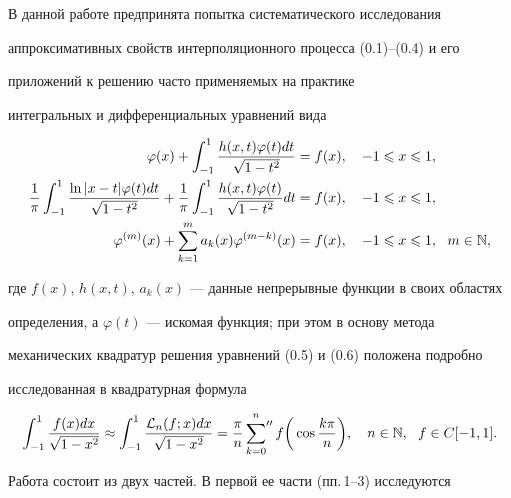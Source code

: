 В данной работе предпринята попытка систематического исследования 


аппроксимативных свойств интерполяционного процесса (0.1)--(0.4) и его 


приложений к решению часто применяемых на практике


интегральных и дифференциальных уравнений вида


\begin{align}


\varphi(x)+\int_{-1}^{1}\frac{h(x,t)\varphi(t)dt}{\sqrt{1-t^2}}&=f(x),


\quad -1 \lea x \lea 1, \\


%


\frac{1}{\pi}\int_{-1}^{1}\frac{\ln|x-t|\varphi(t)dt}{\sqrt{1-t^2}}+


\frac{1}{\pi}\int_{-1}^{1}\frac{h(x,t)\varphi(t)}{\sqrt{1-t^2}}dt&=f(x),


\quad -1 \lea x \lea 1, \\


%


\varphi^{(m)}(x)+\sum_{k=1}^{m}a_k(x)\varphi^{(m-k)}(x)&=f(x),


\quad -1 \lea x \lea 1,\ \ m\in \N,


\end{align}


где $f(x)$, $h(x,t)$, $a_k(x)$ --- данные непрерывные функции в своих областях 


определения, а $\varphi(t)$ --- искомая функция; при этом в основу метода 


механических квадратур решения уравнений (0.5) и (0.6) положена подробно 


исследованная в \cite{9} квадратурная формула


\begin{equation}


\int_{-1}^1\frac{f(x)dx}{\sqrt{1-x^2}}\approx \int_{-1}^1


\frac{\rL_n(f;x)dx}{\sqrt{1-x^2}}=


\frac{\pi}{n}\sideset{}{''}\sum_{k=0}^n f\bigg(\cos \frac{k\pi}{n}\bigg),


\quad n\in \N,\ \ f\in C[-1,1].


\end{equation}





Работа состоит из двух частей. В первой ее части (пп.\,1--3) исследуются


